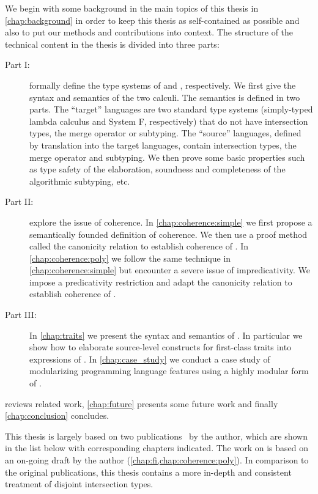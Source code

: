 We begin with some background in the main topics of this thesis in
\cref{chap:background} in order to keep this thesis as self-contained as
possible and also to put our methods and contributions into context. The
structure of the technical content in the thesis is divided into three parts:
\begin{description}
\item[Part I:]  formally define the type systems of
  \namee and \fnamee, respectively. We first give the syntax and semantics of
  the two calculi. The semantics is defined in two parts. The ``target''
  languages are two standard type systems (simply-typed lambda calculus and
  System F, respectively) that do not have intersection types, the merge
  operator or subtyping. The ``source'' languages, defined by translation into
  the target languages, contain intersection types, the merge operator and
  subtyping. We then prove some basic properties such as type safety of
  the elaboration, soundness and completeness of the algorithmic subtyping, etc.
\item[Part II:]  explore the
  issue of coherence. In \cref{chap:coherence:simple} we first propose a
  semantically founded definition of coherence. We then use a proof method
  called the canonicity relation to establish coherence of \namee. In
  \cref{chap:coherence:poly} we follow the same technique in
  \cref{chap:coherence:simple} but encounter a severe issue of impredicativity.
  We impose a predicativity restriction and adapt the canonicity relation to
  establish coherence of \fnamee.
\item[Part III:] In \cref{chap:traits} we present the syntax and semantics of
  \sedel. In particular we show how to elaborate source-level constructs for
  first-class traits into expressions of \fnamee. In \cref{chap:case_study} we
  conduct a case study of modularizing programming language features using a
  highly modular form of \visitor.
\end{description}
 reviews related work, \cref{chap:future} presents some future
work and finally \cref{chap:conclusion} concludes.

This thesis is largely based on two publications~\citep{bi_et_al:LIPIcs:2018:9214, bi_et_al:LIPIcs:2018:9227} by the author, which are shown
in the list below with corresponding chapters indicated. The work on \fnamee is
based on an on-going draft by the author (\cref{chap:fi,chap:coherence:poly}).
In comparison to the original publications, this thesis contains a more in-depth
and consistent treatment of disjoint intersection types.

